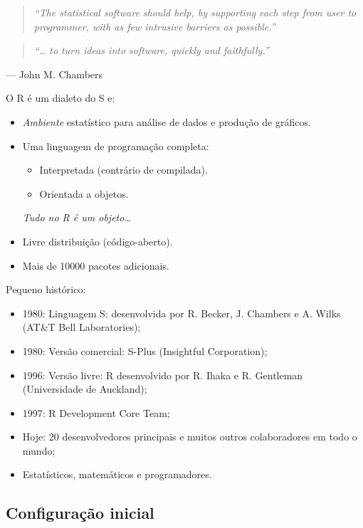 \documentclass[10pt,a4paper]{book}
\providecommand{\tightlist}{%
  \setlength{\itemsep}{0pt}\setlength{\parskip}{0pt}}
\begin{document}
\begin{quote}
\emph{``The statistical software should help, by supporting each step
from user to programmer, with as few intrusive barriers as possible.''}
\end{quote}

\begin{quote}
\emph{``\ldots{} to turn ideas into software, quickly and faithfully.''}
\end{quote}

--- John M. Chambers

O R é um dialeto do S e:

\begin{itemize}
\item
  \emph{Ambiente} estatístico para análise de dados e produção de
  gráficos.
\item
  Uma linguagem de programação completa:

  \begin{itemize}
  \tightlist
  \item
    Interpretada (contrário de compilada).
  \item
    Orientada a objetos.
  \end{itemize}

  \emph{Tudo no R é um objeto\ldots{}}
\item
  Livre distribuição (código-aberto).
\item
  Mais de 10000 pacotes adicionais.
\end{itemize}

Pequeno histórico:

\begin{itemize}
\tightlist
\item
  1980: Linguagem S: desenvolvida por R. Becker, J. Chambers e A. Wilks
  (AT\&T Bell Laboratories);
\item
  1980: Versão comercial: S-Plus (Insightful Corporation);
\item
  1996: Versão livre: R desenvolvido por R. Ihaka e R. Gentleman
  (Universidade de Auckland);
\item
  1997: R Development Core Team;
\item
  Hoje: 20 desenvolvedores principais e muitos outros colaboradores em
  todo o mundo;
\item
  Estatísticos, matemáticos e programadores.
\end{itemize}

\subsection{Configuração inicial}\label{configurauxe7uxe3o-inicial}
\end{document}
